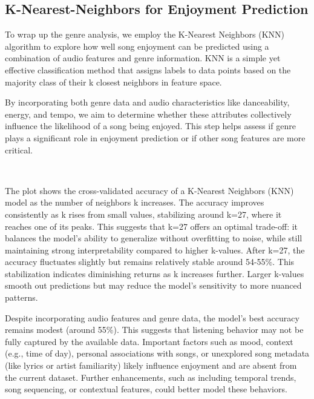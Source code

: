 \documentclass[11pt]{article}
\begin{document}
    \subsection{K-Nearest-Neighbors for Enjoyment
Prediction}\label{k-nearest-neighbors-for-enjoyment-prediction}

To wrap up the genre analysis, we employ the K-Nearest Neighbors (KNN)
algorithm to explore how well song enjoyment can be predicted using a
combination of audio features and genre information. KNN is a simple yet
effective classification method that assigns labels to data points based
on the majority class of their k closest neighbors in feature space.

By incorporating both genre data and audio characteristics like
danceability, energy, and tempo, we aim to determine whether these
attributes collectively influence the likelihood of a song being
enjoyed. This step helps assess if genre plays a significant role in
enjoyment prediction or if other song features are more critical.

    \begin{center}
    \end{center}
    { \hspace*{\fill} \\}
    
    The plot shows the cross-validated accuracy of a K-Nearest Neighbors
(KNN) model as the number of neighbors k increases. The accuracy
improves consistently as k rises from small values, stabilizing around
k=27, where it reaches one of its peaks. This suggests that k=27 offers
an optimal trade-off: it balances the model's ability to generalize
without overfitting to noise, while still maintaining strong
interpretability compared to higher k-values. After k=27, the accuracy
fluctuates slightly but remains relatively stable around 54-55\%. This
stabilization indicates diminishing returns as k increases further.
Larger k-values smooth out predictions but may reduce the model's
sensitivity to more nuanced patterns.

Despite incorporating audio features and genre data, the model's best
accuracy remains modest (around 55\%). This suggests that listening
behavior may not be fully captured by the available data. Important
factors such as mood, context (e.g., time of day), personal associations
with songs, or unexplored song metadata (like lyrics or artist
familiarity) likely influence enjoyment and are absent from the current
dataset. Further enhancements, such as including temporal trends, song
sequencing, or contextual features, could better model these behaviors.
\end{document}
